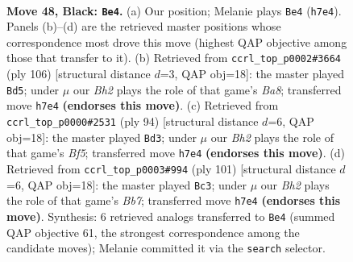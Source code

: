 \documentclass[11pt]{article}
\begin{document}
\clearpage

\begin{figure}[p]\centering
\begin{subfigure}{0.46\textwidth}\centering
\resizebox{\linewidth}{!}{%
\newchessgame
\chessboard[
  setfen={7R/7b/4k3/1pp5/8/8/8/5K2 b - - 1 48},
  showmover=false,
  pgfstyle=straightmove, color=movearrow, markmove={h7-e4}
]}
\caption{}
\end{subfigure}\hfill
\begin{subfigure}{0.46\textwidth}\centering
\resizebox{\linewidth}{!}{%
\newchessgame
\chessboard[
  setfen={Br6/8/7p/8/8/4k1P1/8/6K1 w - - 4 54},
  showmover=false,
  pgfstyle=straightmove, color=movearrow, markmove={a8-d5}
]}
\caption{}
\end{subfigure}
\\[4pt]
\begin{subfigure}{0.46\textwidth}\centering
\resizebox{\linewidth}{!}{%
\newchessgame
\chessboard[
  setfen={7k/8/8/1P3B2/5r2/6p1/8/6K1 w - - 4 48},
  showmover=false,
  pgfstyle=straightmove, color=movearrow, markmove={f5-d3}
]}
\caption{}
\end{subfigure}\hfill
\begin{subfigure}{0.46\textwidth}\centering
\resizebox{\linewidth}{!}{%
\newchessgame
\chessboard[
  setfen={8/8/4p3/6k1/4K3/8/Rb3P2/8 b - - 2 51},
  showmover=false,
  pgfstyle=straightmove, color=movearrow, markmove={b2-c3}
]}
\caption{}
\end{subfigure}
\caption{\textbf{Move 48, Black: \texttt{Be4}.} (a) Our position; Melanie plays \texttt{Be4} (\texttt{h7e4}). Panels (b)--(d) are the retrieved master positions whose correspondence most drove this move (highest QAP objective among those that transfer to it). (b) Retrieved from \texttt{ccrl\_top\_p0002\#3664} (ply 106) [structural distance $d$=3, QAP obj=18]: the master played \texttt{Bd5}; under $\mu$ our \emph{Bh2} plays the role of that game's \emph{Ba8}; transferred move \texttt{h7e4} \textbf{(endorses this move)}. (c) Retrieved from \texttt{ccrl\_top\_p0000\#2531} (ply 94) [structural distance $d$=6, QAP obj=18]: the master played \texttt{Bd3}; under $\mu$ our \emph{Bh2} plays the role of that game's \emph{Bf5}; transferred move \texttt{h7e4} \textbf{(endorses this move)}. (d) Retrieved from \texttt{ccrl\_top\_p0003\#994} (ply 101) [structural distance $d$=6, QAP obj=18]: the master played \texttt{Bc3}; under $\mu$ our \emph{Bh2} plays the role of that game's \emph{Bb7}; transferred move \texttt{h7e4} \textbf{(endorses this move)}. Synthesis: 6 retrieved analogs transferred to \texttt{Be4} (summed QAP objective 61, the strongest correspondence among the candidate moves); Melanie committed it via the \texttt{search} selector.}
\label{fig:thought-m95}
\end{figure}
\end{document}
